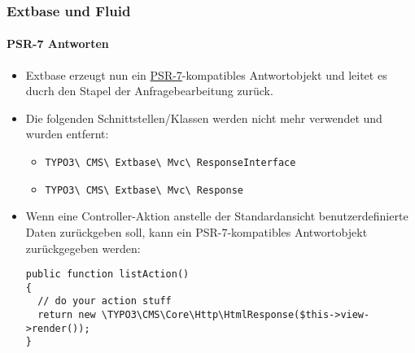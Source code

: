 %

\begin{frame}[fragile]
	\frametitle{Extbase und Fluid}
	\framesubtitle{PSR-7 Antworten}

	\lstset{basicstyle=\tiny\ttfamily}

	\begin{itemize}
		\item Extbase erzeugt nun ein
			\href{https://www.php-fig.org/psr/psr-7/}{PSR-7}-kompatibles
			Antwortobjekt und leitet es ducrh den Stapel der Anfragebearbeitung zurück.
		\item Die folgenden Schnittstellen/Klassen werden nicht mehr verwendet und wurden entfernt:

			\begin{itemize}\smaller
				\item \texttt{TYPO3\textbackslash
					CMS\textbackslash
					Extbase\textbackslash
					Mvc\textbackslash
					ResponseInterface}
				\item \texttt{TYPO3\textbackslash
					CMS\textbackslash
					Extbase\textbackslash
					Mvc\textbackslash
					Response}
			\end{itemize}\normalsize

		\item Wenn eine Controller-Aktion anstelle der Standardansicht benutzerdefinierte Daten zurückgeben soll,
			kann ein PSR-7-kompatibles Antwortobjekt zurückgegeben werden:
\begin{lstlisting}
public function listAction()
{
  // do your action stuff
  return new \TYPO3\CMS\Core\Http\HtmlResponse($this->view->render());
}
\end{lstlisting}
	\end{itemize}

\end{frame}

